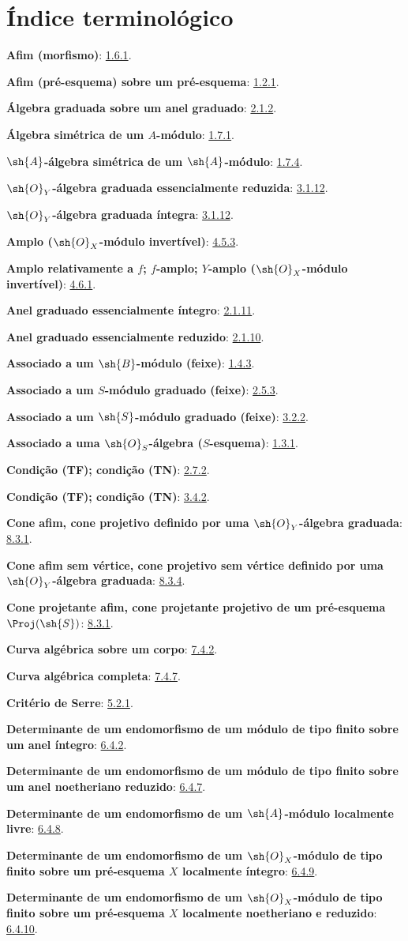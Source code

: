 \documentclass[oneside,10pt]{amsart}
\newcommand{\oldpage}[2][]{\marginnote{\normalfont\footnotesize\textbf{#1}~|~#2}\ignorespaces}
\begin{document}
\endgroup

\clearpage
\oldpage[II]{209}
{}
\section*{Índice terminológico}

\begingroup
\small
\setlength{\parindent}{0pt}
\setlength{\parskip}{2pt}
\newcommand{\egaTerm}[2]{\textbf{#1}: #2.\par}

\egaTerm{Afim (morfismo)}{\hyperref[II.1.6.1]{1.6.1}}
\egaTerm{Afim (pré-esquema) sobre um pré-esquema}{\hyperref[II.1.2.1]{1.2.1}}
\egaTerm{Álgebra graduada sobre um anel graduado}{\hyperref[II.2.1.2]{2.1.2}}
\egaTerm{Álgebra simétrica de um $A$-módulo}{\hyperref[II.1.7.1]{1.7.1}}
\egaTerm{$\sh{A}$-álgebra simétrica de um $\sh{A}$-módulo}{\hyperref[II.1.7.4]{1.7.4}}
\egaTerm{$\sh{O}_Y$-álgebra graduada essencialmente reduzida}{\hyperref[II.3.1.12]{3.1.12}}
\egaTerm{$\sh{O}_Y$-álgebra graduada íntegra}{\hyperref[II.3.1.12]{3.1.12}}
\egaTerm{Amplo ($\sh{O}_X$-módulo invertível)}{\hyperref[II.4.5.3]{4.5.3}}
\egaTerm{Amplo relativamente a $f$; $f$-amplo; $Y$-amplo ($\sh{O}_X$-módulo invertível)}{\hyperref[II.4.6.1]{4.6.1}}
\egaTerm{Anel graduado essencialmente íntegro}{\hyperref[II.2.1.11]{2.1.11}}
\egaTerm{Anel graduado essencialmente reduzido}{\hyperref[II.2.1.10]{2.1.10}}
\egaTerm{Associado a um $\sh{B}$-módulo (feixe)}{\hyperref[II.1.4.3]{1.4.3}}
\egaTerm{Associado a um $S$-módulo graduado (feixe)}{\hyperref[II.2.5.3]{2.5.3}}
\egaTerm{Associado a um $\sh{S}$-módulo graduado (feixe)}{\hyperref[II.3.2.2]{3.2.2}}
\egaTerm{Associado a uma $\sh{O}_S$-álgebra ($S$-esquema)}{\hyperref[II.1.3.1]{1.3.1}}

\egaTerm{Condição (TF); condição (TN)}{\hyperref[II.2.7.2]{2.7.2}}
\egaTerm{Condição (TF); condição (TN)}{\hyperref[II.3.4.2]{3.4.2}}
\egaTerm{Cone afim, cone projetivo definido por uma $\sh{O}_Y$-álgebra graduada}{\hyperref[II.8.3.1]{8.3.1}}
\egaTerm{Cone afim sem vértice, cone projetivo sem vértice definido por uma $\sh{O}_Y$-álgebra graduada}{\hyperref[II.8.3.4]{8.3.4}}
\egaTerm{Cone projetante afim, cone projetante projetivo de um pré-esquema $\Proj(\sh{S})$}{\hyperref[II.8.3.1]{8.3.1}}
\egaTerm{Curva algébrica sobre um corpo}{\hyperref[II.7.4.2]{7.4.2}}
\egaTerm{Curva algébrica completa}{\hyperref[II.7.4.7]{7.4.7}}
\egaTerm{Critério de Serre}{\hyperref[II.5.2.1]{5.2.1}}

\egaTerm{Determinante de um endomorfismo de um módulo de tipo finito sobre um anel íntegro}{\hyperref[II.6.4.2]{6.4.2}}
\egaTerm{Determinante de um endomorfismo de um módulo de tipo finito sobre um anel noetheriano reduzido}{\hyperref[II.6.4.7]{6.4.7}}
\egaTerm{Determinante de um endomorfismo de um $\sh{A}$-módulo localmente livre}{\hyperref[II.6.4.8]{6.4.8}}
\egaTerm{Determinante de um endomorfismo de um $\sh{O}_X$-módulo de tipo finito sobre um pré-esquema $X$ localmente íntegro}{\hyperref[II.6.4.9]{6.4.9}}
\egaTerm{Determinante de um endomorfismo de um $\sh{O}_X$-módulo de tipo finito sobre um pré-esquema $X$ localmente noetheriano e reduzido}{\hyperref[II.6.4.10]{6.4.10}}
\end{document}
